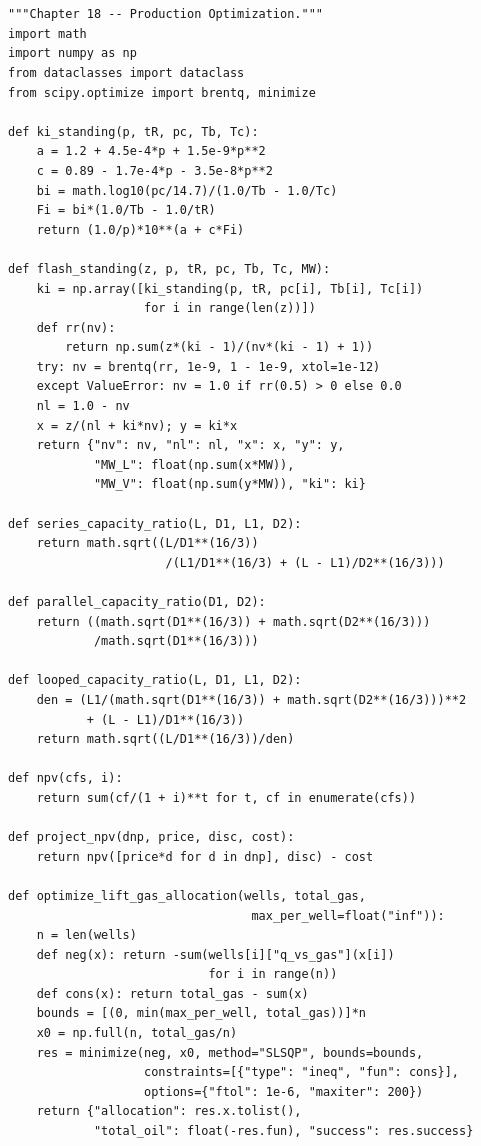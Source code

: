 \documentclass[10pt,a4paper,openany]{book}
\begin{document}
\chapter{}
\begin{lstlisting}
"""Chapter 18 -- Production Optimization."""
import math
import numpy as np
from dataclasses import dataclass
from scipy.optimize import brentq, minimize

def ki_standing(p, tR, pc, Tb, Tc):
    a = 1.2 + 4.5e-4*p + 1.5e-9*p**2
    c = 0.89 - 1.7e-4*p - 3.5e-8*p**2
    bi = math.log10(pc/14.7)/(1.0/Tb - 1.0/Tc)
    Fi = bi*(1.0/Tb - 1.0/tR)
    return (1.0/p)*10**(a + c*Fi)

def flash_standing(z, p, tR, pc, Tb, Tc, MW):
    ki = np.array([ki_standing(p, tR, pc[i], Tb[i], Tc[i])
                   for i in range(len(z))])
    def rr(nv):
        return np.sum(z*(ki - 1)/(nv*(ki - 1) + 1))
    try: nv = brentq(rr, 1e-9, 1 - 1e-9, xtol=1e-12)
    except ValueError: nv = 1.0 if rr(0.5) > 0 else 0.0
    nl = 1.0 - nv
    x = z/(nl + ki*nv); y = ki*x
    return {"nv": nv, "nl": nl, "x": x, "y": y,
            "MW_L": float(np.sum(x*MW)),
            "MW_V": float(np.sum(y*MW)), "ki": ki}

def series_capacity_ratio(L, D1, L1, D2):
    return math.sqrt((L/D1**(16/3))
                      /(L1/D1**(16/3) + (L - L1)/D2**(16/3)))

def parallel_capacity_ratio(D1, D2):
    return ((math.sqrt(D1**(16/3)) + math.sqrt(D2**(16/3)))
            /math.sqrt(D1**(16/3)))

def looped_capacity_ratio(L, D1, L1, D2):
    den = (L1/(math.sqrt(D1**(16/3)) + math.sqrt(D2**(16/3)))**2
           + (L - L1)/D1**(16/3))
    return math.sqrt((L/D1**(16/3))/den)

def npv(cfs, i):
    return sum(cf/(1 + i)**t for t, cf in enumerate(cfs))

def project_npv(dnp, price, disc, cost):
    return npv([price*d for d in dnp], disc) - cost

def optimize_lift_gas_allocation(wells, total_gas,
                                  max_per_well=float("inf")):
    n = len(wells)
    def neg(x): return -sum(wells[i]["q_vs_gas"](x[i])
                            for i in range(n))
    def cons(x): return total_gas - sum(x)
    bounds = [(0, min(max_per_well, total_gas))]*n
    x0 = np.full(n, total_gas/n)
    res = minimize(neg, x0, method="SLSQP", bounds=bounds,
                   constraints=[{"type": "ineq", "fun": cons}],
                   options={"ftol": 1e-6, "maxiter": 200})
    return {"allocation": res.x.tolist(),
            "total_oil": float(-res.fun), "success": res.success}


\end{lstlisting}
\end{document}
